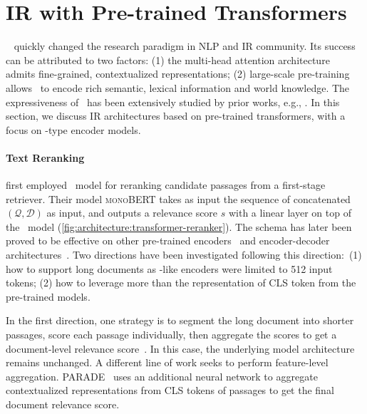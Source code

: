 

\section{IR with Pre-trained Transformers}
\label{sec:transformer}



{\bert}~\cite{devlin-etal-2019-bert} 
quickly changed the research paradigm in NLP and IR community. Its success can be attributed to two factors: (1) the multi-head attention architecture~\cite{vaswani2017attention} admits fine-grained, contextualized representations; (2) large-scale pre-training allows \bert~to encode rich semantic, lexical information and world knowledge. The expressiveness of \bert~has been extensively studied by prior works, e.g., \citet{rogers-etal-2020-primer,tenney-etal-2019-bert,clark2019does}.
In this section, we discuss IR architectures based on pre-trained transformers, with a focus on {\bert}-type encoder models.

\paragraph{Text Reranking}
\citet{nogueira2019multi} first employed {\bert}~model for reranking candidate passages from a first-stage retriever. Their model \textsc{monoBERT} takes as input the sequence of concatenated $(\mathcal{Q}, \mathcal{D})$ as input, and outputs a relevance score $s$ with a linear layer on top of the {\bert}~model (\cref{fig:architecture:transformer-reranker}).
The schema has later been proved to be effective on other pre-trained encoders~\cite{comparing2021zhang} and encoder-decoder architectures~\cite{nogueira2020documentrankingpretrainedsequencetosequence}.
Two directions have been investigated following this direction:\
(1) how to support long documents as {\bert}-like encoders were limited to 512 input tokens;
(2) how to leverage more than the representation of CLS token from the pre-trained models.

In the first direction, one strategy is to segment the long document into shorter passages, score each passage individually, then aggregate the scores to get a document-level relevance score~\cite{Yilmaz2019CrossDomainMO,Dai2019DeeperTU}. In this case, the underlying model architecture remains unchanged. A different line of work seeks to perform feature-level aggregation. \textsc{PARADE}~\cite{Li2020PARADEPR} uses an additional neural network to aggregate contextualized representations from CLS tokens of passages to get the final document relevance score. 

